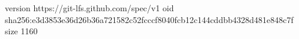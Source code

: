 version https://git-lfs.github.com/spec/v1
oid sha256:e3d3853e36d26b36a721582c52fcccf8040fcb12c144cddbb4328d481e848c7f
size 1160
